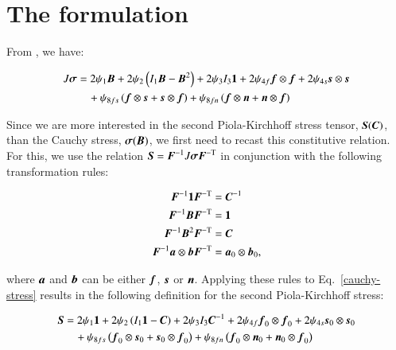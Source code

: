 \section{The formulation}
\label{formulation}

From \citep{Holzapfel:2009bb}, we have:

\begin{equation}
  \begin{split}
    J\Bsigma &=   2 \psi_{1} \bB
                + 2 \psi_{2} \left(I_{1} \bB - \bB^{2}\right)
                + 2 \psi_{3} I_{3} \bone
                + 2 \psi_{4f} \bff\otimes\bff
                + 2 \psi_{4s} \bs\otimes\bs\\
        &\quad  + \psi_{8fs} \left( \bff\otimes\bs + \bs\otimes\bff \right)
                + \psi_{8fn} \left( \bff\otimes\bn + \bn\otimes\bff \right)
  \end{split}
  \label{cauchy-stress}
\end{equation}

\noindent Since we are more interested in the second Piola-Kirchhoff
stress tensor, $\mbox{\boldmath$ S$}(\mbox{\boldmath$ C$})$, than the Cauchy stress, $\mbox{\boldmath$\sigma$}(\mbox{\boldmath$ B$})$, we
first need to recast this constitutive relation. For this, we use the
relation $\mbox{\boldmath$ S$} = \mbox{\boldmath$ F$}^{-1} J \mbox{\boldmath$\sigma$} \mbox{\boldmath$ F$}^{-\mathrm{T}}$ in conjunction with the following transformation
rules:

\begin{equation*}
  \begin{split}
    \mbox{\boldmath$ F$}^{-1} {\bf 1} \mbox{\boldmath$ F$}^{-\mathrm{T}} &= \mbox{\boldmath$ C$}^{-1}\\
    \mbox{\boldmath$ F$}^{-1} \mbox{\boldmath$ B$} \mbox{\boldmath$ F$}^{-\mathrm{T}} &= {\bf 1}\\
    \mbox{\boldmath$ F$}^{-1} \mbox{\boldmath$ B$}^{2} \mbox{\boldmath$ F$}^{-\mathrm{T}} &= \mbox{\boldmath$ C$}\\
    \mbox{\boldmath$ F$}^{-1} \mbox{\boldmath$ a$}\otimes\mbox{\boldmath$ b$} \mbox{\boldmath$ F$}^{-\mathrm{T}} &= \mbox{\boldmath$ a$}_{0} \otimes \mbox{\boldmath$ b$}_{0},
  \end{split}
\end{equation*}

\noindent where $\mbox{\boldmath$ a$}$ and $\mbox{\boldmath$ b$}$ can be either $\mbox{\boldmath$ f$}$, $\mbox{\boldmath$ s$}$ or
$\mbox{\boldmath$ n$}$. Applying these rules to Eq.~\ref{cauchy-stress} results in the
following definition for the second Piola-Kirchhoff stress:

\begin{equation}
  \begin{split}
    \mbox{\boldmath$ S$} &=   2 \psi_{1} {\bf 1}
           + 2 \psi_{2} \left(I_{1} {\bf 1} - \mbox{\boldmath$ C$}\right)
                + 2 \psi_{3} I_{3} \mbox{\boldmath$ C$}^{-1}
                + 2 \psi_{4f} \mbox{\boldmath$ f$}_{0}\otimes\mbox{\boldmath$ f$}_{0}
                + 2 \psi_{4s} \mbox{\boldmath$ s$}_{0}\otimes\mbox{\boldmath$ s$}_{0}\\
        &\quad  + \psi_{8fs} \left( \mbox{\boldmath$ f$}_{0}\otimes\mbox{\boldmath$ s$}_{0} + \mbox{\boldmath$ s$}_{0}\otimes\mbox{\boldmath$ f$}_{0} \right)
                + \psi_{8fn} \left( \mbox{\boldmath$ f$}_{0}\otimes\mbox{\boldmath$ n$}_{0} + \mbox{\boldmath$ n$}_{0}\otimes\mbox{\boldmath$ f$}_{0} \right)
  \end{split}
\end{equation}

%

